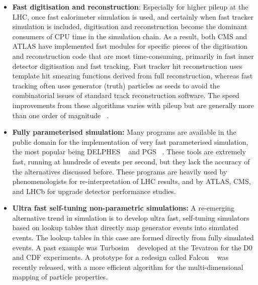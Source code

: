 \documentclass[12pt,a4paper]{article}
\begin{document}
{\begin{itemize}
  speed up the tracker simulation is by introducing fast, parameterised
  models for material interactions, particularly for the more common
  electromagnetic interactions. The fast track simulation code used by
  ATLAS has been made public as a part of the common tracking software
  project ACTS ~\cite{ACTS}, adopted by the FCC. These fast track
  simulations offer speed improvements of 10-1000x over a detailed
  simulation, though for a Fast Simulation including both fast tracking
  and fast calorimeter simulation, tracking is typically the dominant
  resource consumer.
\item
  \textbf{Fast digitisation and reconstruction}: Especially for higher
  pileup at the LHC, once fast calorimeter simulation is used, and
  certainly when fast tracker simulation is included, digitisation and
  reconstruction become the dominant consumers of CPU time in the
  simulation chain. As a result, both CMS and ATLAS have implemented
  fast modules for specific pieces of the digitisation and
  reconstruction code that are most time-consuming, primarily in fast
  inner detector digitisation and fast tracking. Fast tracker hit
  reconstruction uses template hit smearing functions derived from full
  reconstruction, whereas fast tracking often uses generator (truth)
  particles as seeds to avoid the combinatorial issues of standard track
  reconstruction software. The speed improvements from these algorithms
  varies with pileup but are generally more than one order of magnitude
  ~\cite{1742-6596-523-1-012035}.
\item
  \textbf{Fully parameterised simulation:} Many programs are available
  in the public domain for the implementation of very fast parameterised
  simulation, the most popular being DELPHES ~\cite{deFavereau:2013fsa}
  and PGS ~\cite{PGS4}. These
  tools are extremely fast, running at hundreds of events per second,
  but they lack the accuracy of the alternatives discussed before. These
  programs are heavily used by phenomenologists for re-interpretation of
  LHC results, and by ATLAS, CMS, and LHCb for upgrade detector
  performance studies.
\item
  \textbf{Ultra fast self-tuning non-parametric simulations:} A
  re-emerging alternative trend in simulation is to develop ultra fast,
  self-tuning simulators based on lookup tables that directly map
  generator events into simulated events. The lookup tables in this case
  are formed directly from fully simulated events. A past example was
  Turbosim ~\cite{Knuteson:2004nj} developed at the Tevatron for the D0 and CDF
  experiments. A prototype for a redesign called Falcon ~\cite{Brooijmans:2016vro} was
  recently released, with a more efficient algorithm for the
  multi-dimensional mapping of particle properties.
\end{itemize}

}
\end{document}
